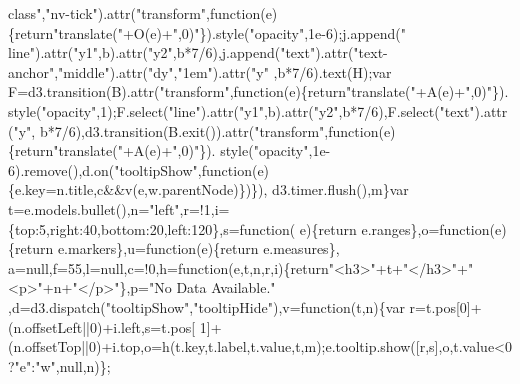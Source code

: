 \begin{DoxyCode}
{      class"},\textcolor{stringliteral}{"nv-tick"}).attr(\textcolor{stringliteral}{"transform"},\textcolor{keyword}{function}(e)\{\textcolor{keywordflow}{return}\textcolor{stringliteral}{"translate("}+O(e)+\textcolor{stringliteral}{",0)"}\}).style(\textcolor{stringliteral}{"opacity"},1e-6);j.append(\textcolor{stringliteral}{"
      line"}).attr(\textcolor{stringliteral}{"y1"},b).attr(\textcolor{stringliteral}{"y2"},b*7/6),j.append(\textcolor{stringliteral}{"text"}).attr(\textcolor{stringliteral}{"text-anchor"},\textcolor{stringliteral}{"middle"}).attr(\textcolor{stringliteral}{"dy"},\textcolor{stringliteral}{"1em"}).attr(\textcolor{stringliteral}{"y"}
      ,b*7/6).text(H);var F=d3.transition(B).attr(\textcolor{stringliteral}{"transform"},\textcolor{keyword}{function}(e)\{\textcolor{keywordflow}{return}\textcolor{stringliteral}{"translate("}+A(e)+\textcolor{stringliteral}{",0)"}\}).
      style(\textcolor{stringliteral}{"opacity"},1);F.select(\textcolor{stringliteral}{"line"}).attr(\textcolor{stringliteral}{"y1"},b).attr(\textcolor{stringliteral}{"y2"},b*7/6),F.select(\textcolor{stringliteral}{"text"}).attr(\textcolor{stringliteral}{"y"},
      b*7/6),d3.transition(B.exit()).attr(\textcolor{stringliteral}{"transform"},\textcolor{keyword}{function}(e)\{\textcolor{keywordflow}{return}\textcolor{stringliteral}{"translate("}+A(e)+\textcolor{stringliteral}{",0)"}\}).
      style(\textcolor{stringliteral}{"opacity"},1e-6).remove(),d.on(\textcolor{stringliteral}{"tooltipShow"},\textcolor{keyword}{function}(e)\{e.key=n.title,c&&v(e,w.parentNode)\})\}),
      d3.timer.flush(),m\}var t=e.models.bullet(),n=\textcolor{stringliteral}{"left"},r=!1,i=\{top:5,right:40,bottom:20,left:120\},s=\textcolor{keyword}{function}(
      e)\{\textcolor{keywordflow}{return} e.ranges\},o=\textcolor{keyword}{function}(e)\{\textcolor{keywordflow}{return} e.markers\},u=\textcolor{keyword}{function}(e)\{\textcolor{keywordflow}{return} e.measures\},
      a=null,f=55,l=null,c=!0,h=\textcolor{keyword}{function}(e,t,n,r,i)\{\textcolor{keywordflow}{return}\textcolor{stringliteral}{"<h3>"}+t+\textcolor{stringliteral}{"</h3>"}+\textcolor{stringliteral}{"<p>"}+n+\textcolor{stringliteral}{"</p>"}\},p=\textcolor{stringliteral}{"No Data Available."}
      ,d=d3.dispatch(\textcolor{stringliteral}{"tooltipShow"},\textcolor{stringliteral}{"tooltipHide"}),v=\textcolor{keyword}{function}(t,n)\{var r=t.pos[0]+(n.offsetLeft||0)+i.left,s=t.pos[
      1]+(n.offsetTop||0)+i.top,o=h(t.key,t.label,t.value,t,m);e.tooltip.show([r,s],o,t.value<0?\textcolor{stringliteral}{"e"}:\textcolor{stringliteral}{"w"},null,n)\};\textcolor{keywordflow}{
}
\end{DoxyCode}
